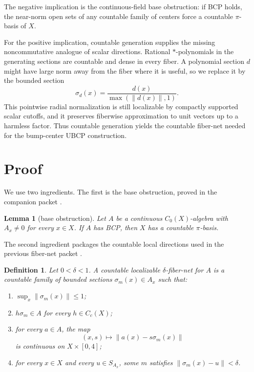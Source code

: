 \documentclass[11pt]{article}
\newtheorem{lemma}{Lemma}
\newtheorem{definition}{Definition}
\begin{document}
The negative implication is the continuous-field base obstruction: if BCP
holds, the near-norm open sets of any countable family of centers force a
countable \(\pi\)-basis of \(X\).

For the positive implication, countable generation supplies the missing
noncommutative analogue of scalar directions.  Rational \(*\)-polynomials in
the generating sections are countable and dense in every fiber.  A polynomial
section \(d\) might have large norm away from the fiber where it is useful, so
we replace it by the bounded section
\[
        \sigma_d(x)=\frac{d(x)}{\max(\|d(x)\|,1)}.
\]
This pointwise radial normalization is still localizable by compactly
supported scalar cutoffs, and it preserves fiberwise approximation to unit
vectors up to a harmless factor.  Thus countable generation yields the
countable fiber-net needed for the bump-center UBCP construction.

\section*{Proof}

We use two ingredients.  The first is the base obstruction, proved in the
companion packet \cite{lane19base}.

\begin{lemma}[base obstruction]
\label{lem:base}
Let \(A\) be a continuous \(C_0(X)\)-algebra with \(A_x\ne0\) for every
\(x\in X\).  If \(A\) has BCP, then \(X\) has a countable \(\pi\)-basis.
\end{lemma}

The second ingredient packages the countable local directions used in the
previous fiber-net packet \cite{lane19net}.

\begin{definition}
Let \(0<\delta<1\).  A countable localizable \(\delta\)-fiber-net for \(A\) is
a countable family of bounded sections \(\sigma_m(x)\in A_x\) such that:
\begin{enumerate}
    \item \(\sup_x\|\sigma_m(x)\|\le1\);
    \item \(h\sigma_m\in A\) for every \(h\in C_c(X)\);
    \item for every \(a\in A\), the map
    \[
        (x,s)\mapsto \|a(x)-s\sigma_m(x)\|
    \]
    is continuous on \(X\times[0,4]\);
    \item for every \(x\in X\) and every \(u\in S_{A_x}\), some \(m\) satisfies
    \(\|\sigma_m(x)-u\|<\delta\).
\end{enumerate}
\end{definition}
\end{document}
